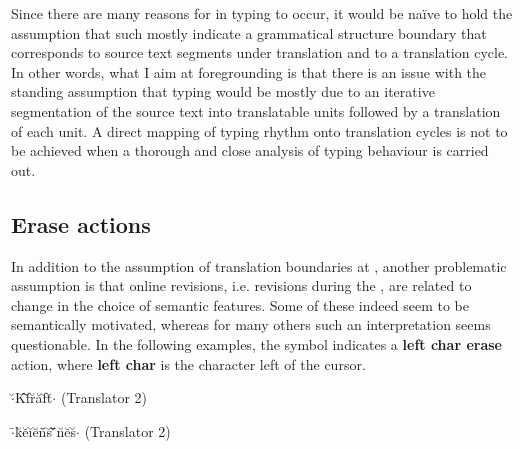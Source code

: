 \documentclass[output=paper]{LSP/langsci}
\begin{document}
Since there are many reasons for  in typing to occur, it would be naïve to hold the assumption that such  mostly indicate a grammatical structure boundary that corresponds to source text segments under translation and to a translation cycle. In other words, what I aim at foregrounding is that there is an issue with the standing assumption that typing  would be mostly due to an iterative segmentation of the source text into translatable units followed by a translation of each unit. A direct mapping of typing rhythm onto translation cycles is not to be achieved when a thorough and close analysis of typing behaviour is carried out.



\subsection{Erase actions}
\label{couto:sec:EraseActions}

In addition to the assumption of translation boundaries at , another problematic assumption is that online revisions, i.e. revisions during the , are related to change in the choice of semantic features. Some of these  indeed seem to be semantically motivated, whereas for many others such an interpretation seems questionable. In the following examples, the symbol \uettl{ } indicates a \textbf{left char erase} action, where \textbf{left char} is the character left of the cursor.


\begin{exe}%
	\ex\label{couto:ex:4}$\cdot$\u{ }K\={ }f\=\uettl\u{ }r\u{ }a\u{ }f\u{ }t\u{ }$\cdot$ (Translator 2)
\end{exe}

\begin{exe}%
	\ex\label{couto:ex:5}$\cdot$\={ }k\u{ }e\u{ }i\u{ }e\u{ }n\={ }\uettl\u{ }s\u{ } \={ }\uettl\u{ }\uettl\u{ }\uettl\={ }n\u{ }e\u{ }s\u{ }$\cdot$ (Translator 2)
\end{exe}
\end{document}

